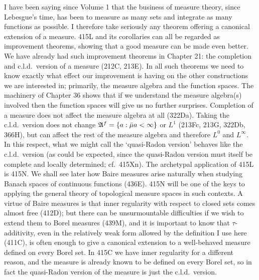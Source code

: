{I have been saying since Volume 1 that the business of measure theory,
since Lebesgue's time, has been to measure as many sets and integrate as
many functions as possible.   I therefore take seriously any theorem
offering a
canonical extension of a measure.   415L and its corollaries can all be
regarded as improvement theorems, showing that a good measure can be
made even better.   We have already had such improvement theorems in
Chapter 21:  the completion and c.l.d.\ version of a measure (212C,
213E).   In all such
theorems we need to know exactly what effect our improvement is having
on the other constructions we are interested in;  primarily, the measure
algebra and the function spaces.   The machinery of Chapter 36 shows
that if we understand the measure algebra(s) involved then the function
spaces will give us no further surprises.   Completion of a measure does
not affect the
measure algebra at all (322Da).   Taking the c.l.d.\ version does not
change $\frak A^f=\{a:\bar\mu a<\infty\}$ or $L^1$ (213Fc, 213G, 322Db,
366H), but can affect the rest of the measure algebra and
therefore $L^0$ and $L^{\infty}$. In this respect, what we might call
the `quasi-Radon version' behaves like
the c.l.d.\ version (as could be expected, since the quasi-Radon version
must itself be complete and locally determined;  cf.\ 415Xn).
The archetypal application of 415L is 415N.   We shall see later how
Baire measures arise naturally when studying Banach spaces of continuous
functions (436E).   415N will be one of the keys to applying the
general theory of
topological measure spaces in such contexts.   A virtue of Baire
measures is that inner regularity with respect to closed sets comes
almost free
(412D);  but there can be unsurmountable difficulties if we wish to
extend them to Borel measures (439M), and it is important to know
that $\tau$-additivity, even in the relatively weak form allowed by the
definition I use here (411C), is often enough to give a canonical
extension to
a well-behaved measure defined on every Borel set.   In 415C we have
inner regularity for a different reason, and the measure is already
known to be
defined on every Borel set, so in fact the quasi-Radon version of the
measure is just the c.l.d.\ version.

}
